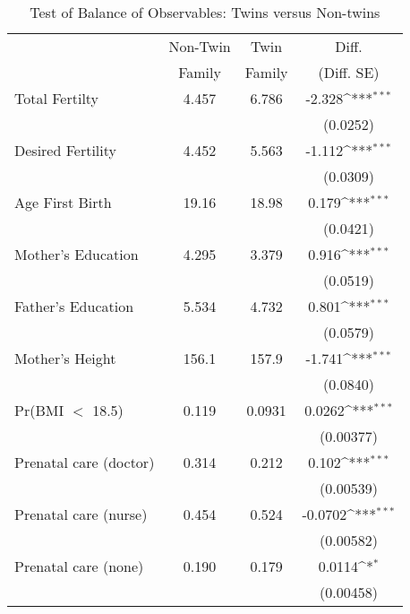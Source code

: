 \begin{table}[htbp]\centering
\def\sym#1{\ifmmode^{#1}\else\(^{#1}\)\fi}
\caption{Test of Balance of Observables: Twins versus Non-twins \label{TWINtab:comp}}
\begin{tabular}{l*{1}{ccc}}
\toprule\toprule & Non-Twin & Twin & Diff.\\
                    &        Family&        Family&      (Diff. SE)         \\
\midrule
Total Fertilty      &       4.457&       6.786&      -2.328\sym{***}\\
                    &            &            &    (0.0252)         \\
Desired Fertility   &       4.452&       5.563&      -1.112\sym{***}\\
                    &            &            &    (0.0309)         \\
Age First Birth     &       19.16&       18.98&       0.179\sym{***}\\
                    &            &            &    (0.0421)         \\
Mother's Education  &       4.295&       3.379&       0.916\sym{***}\\
                    &            &            &    (0.0519)         \\
Father's Education  &       5.534&       4.732&       0.801\sym{***}\\
                    &            &            &    (0.0579)         \\
Mother's Height     &       156.1&       157.9&      -1.741\sym{***}\\
                    &            &            &    (0.0840)         \\
Pr(BMI $<$ 18.5)    &       0.119&      0.0931&      0.0262\sym{***}\\
                    &            &            &   (0.00377)         \\
Prenatal care (doctor)&       0.314&       0.212&       0.102\sym{***}\\
                    &            &            &   (0.00539)         \\
Prenatal care (nurse)&       0.454&       0.524&     -0.0702\sym{***}\\
                    &            &            &   (0.00582)         \\
Prenatal care (none)&       0.190&       0.179&      0.0114\sym{*}  \\
                    &            &            &   (0.00458)         \\

\end{tabular}
\end{table}
